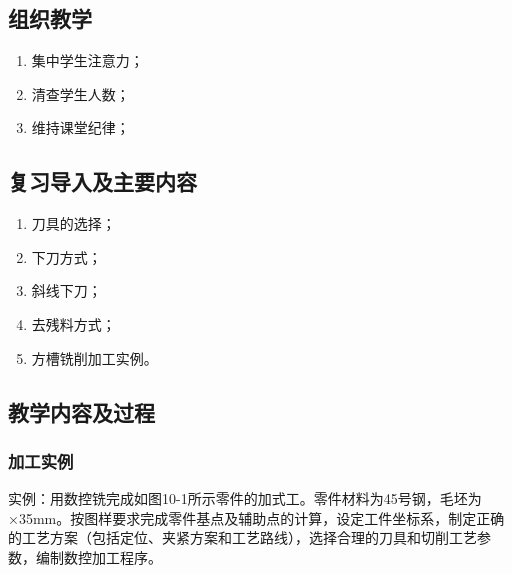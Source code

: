 \jxhj{%
	}

\makeshouye %

\subsection{组织教学}
\begin{enumerate}[\hspace{2em}1、]
	\item 集中学生注意力；
	\item 清查学生人数；
	\item 维持课堂纪律；
\end{enumerate}

\subsection{复习导入及主要内容}
\begin{enumerate}[1、]
\item 刀具的选择；
\item 下刀方式；
\item 斜线下刀；
\item 去残料方式；
\item 方槽铣削加工实例。
\end{enumerate}

\subsection{教学内容及过程}
\subsubsection{加工实例}
实例：用数控铣完成如图10-1所示零件的加式工。零件材料为45号钢，毛坯为×35mm。按图样要求完成零件基点及辅助点的计算，设定工件坐标系，制定正确的工艺方案（包括定位、夹紧方案和工艺路线），选择合理的刀具和切削工艺参数，编制数控加工程序。

